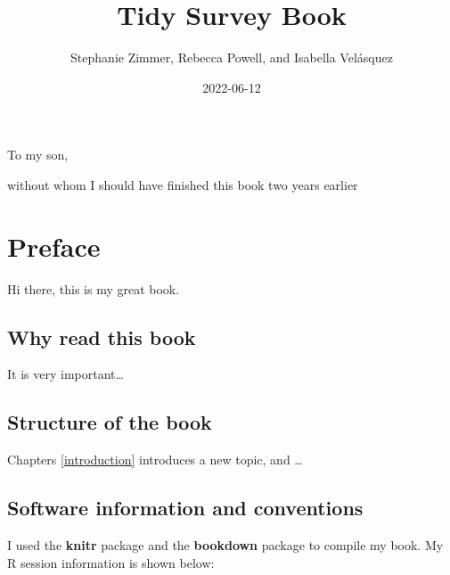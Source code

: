 \documentclass[
]{krantz}
\title{Tidy Survey Book}
\author{Stephanie Zimmer, Rebecca Powell, and Isabella Velásquez}
\date{2022-06-12}
\begin{document}
\maketitle


\thispagestyle{empty}

\begin{center}
To my son,

without whom I should have finished this book two years earlier
\end{center}

\setlength{\abovedisplayskip}{-5pt}
\setlength{\abovedisplayshortskip}{-5pt}

{
\hypersetup{linkcolor=}
\setcounter{tocdepth}{2}
\tableofcontents
}
\listoffigures
\listoftables
\hypertarget{preface}{%
\chapter*{Preface}\label{preface}}


Hi there, this is my great book.

\hypertarget{why-read-this-book}{%
\section*{Why read this book}\label{why-read-this-book}}


It is very important\ldots{}

\hypertarget{structure-of-the-book}{%
\section*{Structure of the book}\label{structure-of-the-book}}


Chapters \ref{introduction} introduces a new topic, and \ldots{}

\hypertarget{software-information-and-conventions}{%
\section*{Software information and conventions}\label{software-information-and-conventions}}


I used the \textbf{knitr} package \citep{xie2015} and the \textbf{bookdown} package \citep{R-bookdown} to compile my book. My R session information is shown below:
\end{document}
